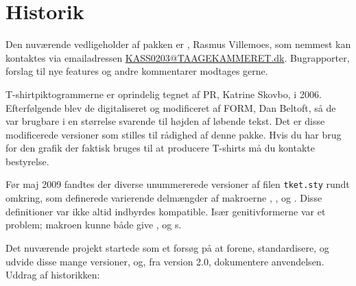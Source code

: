 \documentclass[a4paper,article,oneside,danish]{memoir}
\newcommand{\emaillink}[1]{\href{mailto:#1}{#1}}
\newcommand{\filnavn}[1]{\texttt{#1}}
\begin{document}
\section{Historik}
\label{sec:historik}

Den nuværende vedligeholder af pakken er \KASS, Rasmus
Villemoes, som nemmest kan kontaktes via emailadressen
\emaillink{KASS0203@TAAGEKAMMERET.dk}. Bugrapporter, forslag til nye
features og andre kommentarer modtages gerne.

T-shirtpiktogrammerne er oprindelig tegnet af PR,
Katrine Skovbo, i 2006. Efterfølgende blev de digitaliseret og
modificeret af FORM, Dan Beltoft, så de var brugbare i
en størrelse svarende til højden af løbende tekst. Det er disse
modificerede versioner som stilles til rådighed af denne pakke. Hvis
du har brug for den grafik der faktisk bruges til at producere
T-shirts må du kontakte \TKETs bestyrelse.

Før maj 2009 fandtes der diverse unummererede versioner af filen
\filnavn{tket.sty} rundt omkring, som definerede varierende delmængder
af makroerne , ,  og . Disse
definitioner var ikke altid indbyrdes kompatible. Især genitivformerne
var et problem; makroen  kunne både give \TKETS, \TKETs og
\TKET{}s.

Det nuværende projekt startede som et forsøg på at forene,
standardisere, og udvide disse mange versioner, og, fra version 2.0,
dokumentere anvendelsen. Uddrag af historikken:
\end{document}
